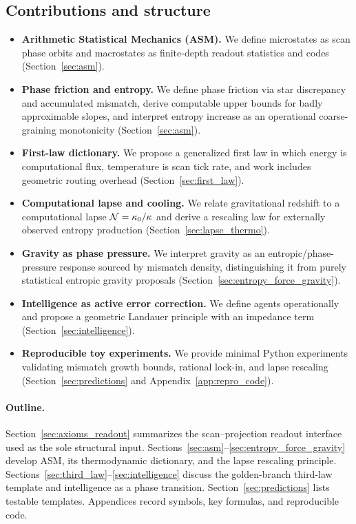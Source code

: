 \subsection{Contributions and structure}
\label{subsec:contributions}

\begin{itemize}
  \item \textbf{Arithmetic Statistical Mechanics (ASM).} We define microstates as scan phase orbits and macrostates as finite-depth readout statistics and codes (Section~\ref{sec:asm}).
  \item \textbf{Phase friction and entropy.} We define phase friction via star discrepancy and accumulated mismatch, derive computable upper bounds for badly approximable slopes, and interpret entropy increase as an operational coarse-graining monotonicity (Section~\ref{sec:asm}).
  \item \textbf{First-law dictionary.} We propose a generalized first law in which energy is computational flux, temperature is scan tick rate, and work includes geometric routing overhead (Section~\ref{sec:first_law}).
  \item \textbf{Computational lapse and cooling.} We relate gravitational redshift to a computational lapse $\mathcal{N}=\kappa_0/\kappa$ and derive a rescaling law for externally observed entropy production (Section~\ref{sec:lapse_thermo}).
  \item \textbf{Gravity as phase pressure.} We interpret gravity as an entropic/phase-pressure response sourced by mismatch density, distinguishing it from purely statistical entropic gravity proposals \cite{Verlinde2011} (Section~\ref{sec:entropy_force_gravity}).
  \item \textbf{Intelligence as active error correction.} We define agents operationally and propose a geometric Landauer principle with an impedance term (Section~\ref{sec:intelligence}).
  \item \textbf{Reproducible toy experiments.} We provide minimal Python experiments validating mismatch growth bounds, rational lock-in, and lapse rescaling (Section~\ref{sec:predictions} and Appendix~\ref{app:repro_code}).
\end{itemize}

\paragraph{Outline.}
Section~\ref{sec:axioms_readout} summarizes the scan--projection readout interface used as the sole structural input. Sections~\ref{sec:asm}--\ref{sec:entropy_force_gravity} develop ASM, its thermodynamic dictionary, and the lapse rescaling principle. Sections~\ref{sec:third_law}--\ref{sec:intelligence} discuss the golden-branch third-law template and intelligence as a phase transition. Section~\ref{sec:predictions} lists testable templates. Appendices record symbols, key formulas, and reproducible code.


